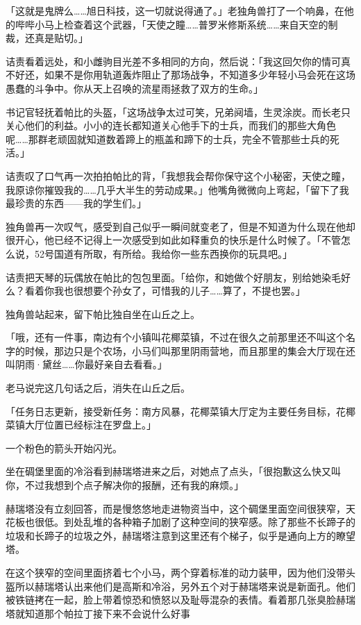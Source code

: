 「这就是鬼牌么……旭日科技，这一切就说得通了。」老独角兽打了一个响鼻，在他的哔哔小马上检查着这个武器，「天使之瞳……普罗米修斯系统……来自天空的制裁，还真是贴切。」

诘责看着远处，和小雌驹目光差不多相同的方向，然后说：「我这回欠你的情可真不好还，如果不是你用轨道轰炸阻止了那场战争，不知道多少年轻小马会死在这场愚蠢的斗争中。你从天上召唤的流星雨拯救了双方的生命。」

书记官轻抚着帕比的头盔，「这场战争太过可笑，兄弟阋墙，生灵涂炭。而长老只关心他们的利益。小小的连长都知道关心他手下的士兵，而我们的那些大角色呢……那群老顽固就知道数着蹄上的瓶盖和蹄下的士兵，完全不管那些士兵的死活。」

诘责叹了口气再一次拍拍帕比的背，「我想我会帮你保守这个小秘密，天使之瞳，我原谅你摧毁我的……几乎大半生的劳动成果。」他嘴角微微向上弯起，「留下了我最珍贵的东西——我的学生们。」

独角兽再一次叹气，感受到自己似乎一瞬间就变老了，但是不知道为什么现在他却很开心，他已经不记得上一次感受到如此如释重负的快乐是什么时候了。「不管怎么说，52号国道有所取，有所给。我给你一些东西换你的玩具吧。」

诘责把天琴的玩偶放在帕比的包包里面。「给你，和她做个好朋友，别给她染毛好么？看着你我也很想要个孙女了，可惜我的儿子……算了，不提也罢。」

独角兽站起来，留下帕比独自坐在山丘之上。

「哦，还有一件事，南边有个小镇叫花椰菜镇，不过在很久之前那里还不叫这个名字的时候，那边只是个农场，小马们叫那里阴雨营地，而且那里的集会大厅现在还叫阴雨·黛丝……你最好亲自去看看。」

老马说完这几句话之后，消失在山丘之后。

「{\rt 任务日志更新，接受新任务：南方风暴，花椰菜镇大厅定为主要任务目标，花椰菜镇大厅位置已经标注在罗盘上。}」

一个粉色的箭头开始闪光。

\horizonline


坐在碉堡里面的冷浴看到赫瑞塔进来之后，对她点了点头，「很抱歉这么快又叫你，不过我想到个点子解决你的报酬，还有我的麻烦。」

赫瑞塔没有立刻回答，而是慢悠悠地走进物资当中，这个碉堡里面空间很狭窄，天花板也很低。到处乱堆的各种箱子加剧了这种空间的狭窄感。除了那些不长蹄子的垃圾和长蹄子的垃圾之外，赫瑞塔注意到这里还有个梯子，似乎是通向上方的瞭望塔。

在这个狭窄的空间里面挤着七个小马，两个穿着标准的动力装甲，因为他们没带头盔所以赫瑞塔认出来他们是高斯和冷浴，另外五个对于赫瑞塔来说是新面孔。他们被铁链拷在一起，脸上带着惊恐和愤怒以及耻辱混杂的表情。看着那几张臭脸赫瑞塔就知道那个帕拉丁接下来不会说什么好事

